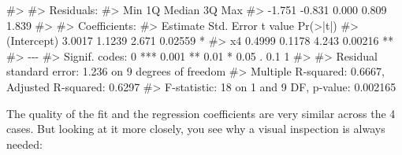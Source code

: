 \documentclass[
  letterpaper,
  DIV=11,
  numbers=noendperiod]{scrreprt}
\newenvironment{Shaded}{\begin{snugshade}}{\end{snugshade}}
\newcommand{\CommentTok}[1]{\textcolor[rgb]{0.37,0.37,0.37}{#1}}
\begin{document}
\begin{Shaded}
\begin{Highlighting}[]
\CommentTok{\#\textgreater{} }
\CommentTok{\#\textgreater{} Residuals:}
\CommentTok{\#\textgreater{}    Min     1Q Median     3Q    Max }
\CommentTok{\#\textgreater{} {-}1.751 {-}0.831  0.000  0.809  1.839 }
\CommentTok{\#\textgreater{} }
\CommentTok{\#\textgreater{} Coefficients:}
\CommentTok{\#\textgreater{}             Estimate Std. Error t value Pr(\textgreater{}|t|)   }
\CommentTok{\#\textgreater{} (Intercept)   3.0017     1.1239   2.671  0.02559 * }
\CommentTok{\#\textgreater{} x4            0.4999     0.1178   4.243  0.00216 **}
\CommentTok{\#\textgreater{} {-}{-}{-}}
\CommentTok{\#\textgreater{} Signif. codes:  0 \textquotesingle{}***\textquotesingle{} 0.001 \textquotesingle{}**\textquotesingle{} 0.01 \textquotesingle{}*\textquotesingle{} 0.05 \textquotesingle{}.\textquotesingle{} 0.1 \textquotesingle{} \textquotesingle{} 1}
\CommentTok{\#\textgreater{} }
\CommentTok{\#\textgreater{} Residual standard error: 1.236 on 9 degrees of freedom}
\CommentTok{\#\textgreater{} Multiple R{-}squared:  0.6667, Adjusted R{-}squared:  0.6297 }
\CommentTok{\#\textgreater{} F{-}statistic:    18 on 1 and 9 DF,  p{-}value: 0.002165}
\end{Highlighting}
\end{Shaded}

The quality of the fit and the regression coefficients are very similar
across the 4 cases. But looking at it more closely, you see why a visual
inspection is always needed:
\end{document}
